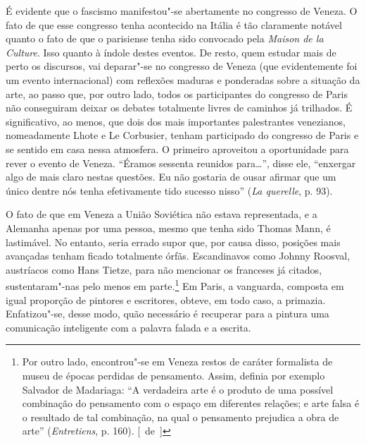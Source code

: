 É evidente que o fascismo manifestou"-se abertamente no congresso de
Veneza. O fato de que esse congresso tenha acontecido na Itália é tão
claramente notável quanto o fato de que o parisiense tenha
sido convocado pela \emph{Maison de la Culture}. Isso quanto à índole
destes eventos. De resto, quem estudar mais de perto os
discursos, vai deparar"-se no congresso de Veneza (que evidentemente foi um
evento internacional) com reflexões maduras e ponderadas sobre a
situação da arte, ao passo que, por outro lado, todos
os participantes do congresso de Paris não conseguiram deixar os
debates totalmente livres de caminhos já trilhados. É significativo, ao
menos, que dois dos mais importantes palestrantes venezianos, nomeadamente Lhote e Le Corbusier, tenham
participado do congresso de Paris e se sentido em casa nessa atmosfera.
O primeiro aproveitou a oportunidade para
rever o evento de Veneza. ``Éramos sessenta reunidos
para\ldots{}'', disse ele, ``enxergar algo de mais claro nestas questões.
Eu não gostaria de ousar afirmar que um único dentre nós tenha
efetivamente tido sucesso nisso'' (\emph{La querelle}, p. 93).

O fato de que em Veneza a União Soviética não estava representada, e a
Alemanha apenas por uma pessoa, mesmo que tenha sido Thomas Mann, é
lastimável. No entanto, seria errado supor que, por causa disso,
posições mais avançadas tenham ficado totalmente órfãs. Escandinavos
como Johnny Roosval, austríacos como Hans Tietze, para não mencionar os
franceses já citados, sustentaram"-nas pelo menos em parte.\footnote{Por
  outro lado, encontrou"-se em Veneza restos de caráter formalista de
  museu de épocas perdidas de pensamento. Assim, definia por exemplo
  Salvador de Madariaga: ``A verdadeira arte é o produto de uma possível
  combinação do pensamento com o espaço em diferentes relações; e arte
  falsa é o resultado de tal combinação, na qual o pensamento prejudica
  a obra de arte'' (\emph{Entretiens}, p. 160). [~de~]} Em Paris, a vanguarda, composta
em igual proporção de pintores e escritores,
obteve, em todo caso, a primazia. Enfatizou"-se, desse modo, quão
necessário é recuperar para a pintura uma comunicação inteligente com a
palavra falada e a escrita.

